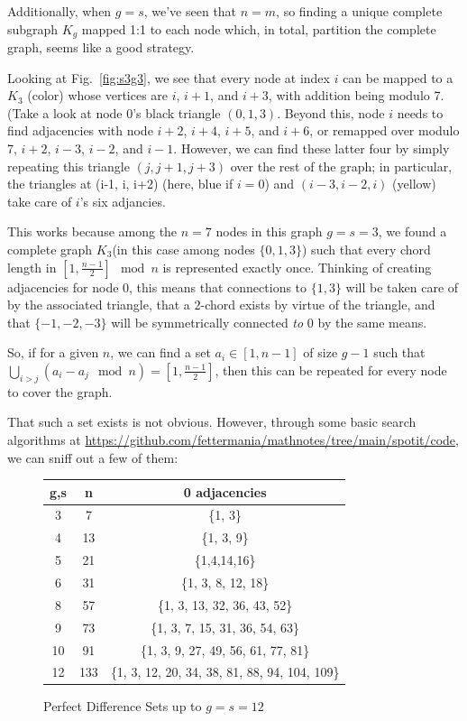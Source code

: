 \documentclass[11pt, oneside]{article} 	%
\begin{document}
Additionally, when $g=s$, we've seen that $n = m$, so finding a unique complete subgraph $K_g$ mapped 1:1 to each node which, in total, partition the complete graph, seems like a good strategy.

Looking at Fig.~\ref{fig:s3g3}, we see that every node at index $i$ can be mapped to a $K_3$ (color) whose vertices are $i$, $i+1$, and $i+3$, with addition being modulo 7. (Take a look at node 0's black triangle $(0, 1, 3)$. Beyond this, node $i$ needs to find adjacencies with node $i+2$, $i+4$, $i+5$, and $i+6$, or remapped over modulo 7, $i+2$, $i-3$, $i-2$, and $i-1$. However, we can find these latter four by simply repeating this triangle $(j, j+1, j+3)$ over the rest of the graph; in particular, the triangles at (i-1, i, i+2) (here, blue if $i=0$) and $(i-3, i-2, i)$ (yellow) take care of $i$'s six adjancies.

This works because among the $n=7$ nodes in this graph $g=s=3$, we found a complete graph $K_3$(in this case among nodes $\{0, 1, 3\}$) such that every chord length in $[1, \frac{n-1}{2}]\mod n$ is represented exactly once. Thinking of creating adjacencies for node 0, this means that connections to $\{1, 3\}$ will be taken care of by the associated triangle, that a $2$-chord exists by virtue of the triangle, and that $\{-1, -2, -3\}$ will be symmetrically connected \emph{to} 0 by the same means.

So, if for a given $n$, we can find a set $a_i \in [1,n-1]$ of size $g-1$ such that $\bigcup_{i > j} (a_i - a_j \mod n) = [1, \frac{n-1}{2}]$, then this can be repeated for every node to cover the graph.

That such a set exists is not obvious. However, through some basic search algorithms at \url{https://github.com/fettermania/mathnotes/tree/main/spotit/code}, we can sniff out a few of them:

\begin{figure}[!htb]
 \begin{tabular}{c c | c }
  g,s & n & 0 adjacencies \\
\hline
  3 & 7 & \{1, 3\} \\
  4 & 13 & \{1, 3, 9\} \\
  5 & 21 & \{1,4,14,16\} \\
  6 & 31 & \{1, 3, 8, 12, 18\} \\
  8 & 57 & \{1, 3, 13, 32, 36, 43, 52\} \\
  9 & 73 & \{1, 3, 7, 15, 31, 36, 54, 63\} \\
  10 & 91 & \{1, 3, 9, 27, 49, 56, 61, 77, 81\} \\
  12 & 133 & \{1, 3, 12, 20, 34, 38, 81, 88, 94, 104, 109\} \\
  \end{tabular}
 \caption{Perfect Difference Sets up to $g=s=12$}
\label{fig:perfect-diffs}
\end{figure}
\end{document}
